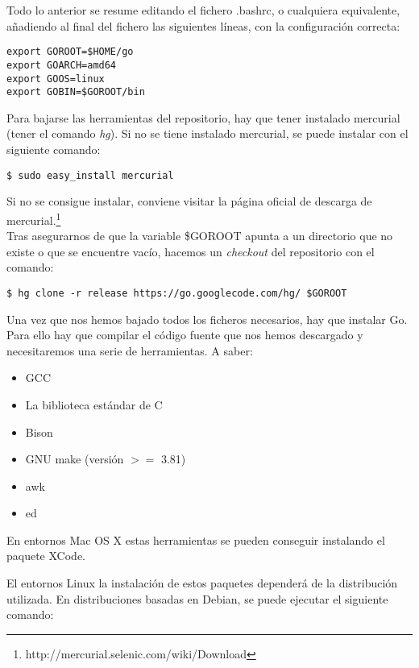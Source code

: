 	Todo lo anterior se resume editando el fichero .bashrc, o cualquiera
	equivalente, añadiendo al final del fichero las siguientes líneas, con la
	configuración correcta:

\begin{lstlisting}[numbers=none]
export GOROOT=$HOME/go
export GOARCH=amd64
export GOOS=linux
export GOBIN=$GOROOT/bin
\end{lstlisting}

	Para bajarse las herramientas del repositorio, hay que tener instalado mercurial
	(tener el comando \emph{hg}). Si no se tiene instalado mercurial, se puede
	instalar con el siguiente comando:

\begin{lstlisting}[numbers=none]
$ sudo easy_install mercurial
\end{lstlisting}

	Si no se consigue instalar, conviene visitar la página oficial de descarga de
	mercurial.\footnote{http://mercurial.selenic.com/wiki/Download}\\

	Tras asegurarnos de que la variable \$GOROOT apunta a un directorio que no
	existe o que se encuentre vacío, hacemos un \emph{checkout} del repositorio
	con el comando:

\begin{lstlisting}[numbers=none]
$ hg clone -r release https://go.googlecode.com/hg/ $GOROOT
\end{lstlisting}

	Una vez que nos hemos bajado todos los ficheros necesarios, hay que instalar Go.
	Para ello hay que compilar el código fuente que nos hemos descargado
	y necesitaremos una serie de herramientas. A saber:

	\begin{itemize}
		\item GCC
		\item La biblioteca estándar de C
		\item Bison
		\item GNU make (versión $>=$ 3.81)
		\item awk
		\item ed
	\end{itemize}

	En entornos Mac OS X estas herramientas se pueden conseguir instalando el
	paquete XCode\cite{XCode}.

	El entornos Linux la instalación de estos paquetes dependerá de la
	distribución utilizada. En distribuciones basadas en Debian, se puede
	ejecutar el siguiente comando:

